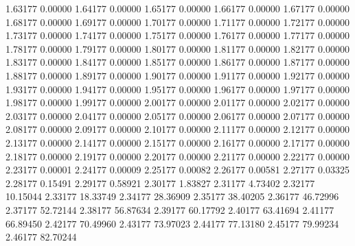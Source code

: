       1.63177      0.00000    
      1.64177      0.00000    
      1.65177      0.00000    
      1.66177      0.00000    
      1.67177      0.00000    
      1.68177      0.00000    
      1.69177      0.00000    
      1.70177      0.00000    
      1.71177      0.00000    
      1.72177      0.00000    
      1.73177      0.00000    
      1.74177      0.00000    
      1.75177      0.00000    
      1.76177      0.00000    
      1.77177      0.00000    
      1.78177      0.00000    
      1.79177      0.00000    
      1.80177      0.00000    
      1.81177      0.00000    
      1.82177      0.00000    
      1.83177      0.00000    
      1.84177      0.00000    
      1.85177      0.00000    
      1.86177      0.00000    
      1.87177      0.00000    
      1.88177      0.00000    
      1.89177      0.00000    
      1.90177      0.00000    
      1.91177      0.00000    
      1.92177      0.00000    
      1.93177      0.00000    
      1.94177      0.00000    
      1.95177      0.00000    
      1.96177      0.00000    
      1.97177      0.00000    
      1.98177      0.00000    
      1.99177      0.00000    
      2.00177      0.00000    
      2.01177      0.00000    
      2.02177      0.00000    
      2.03177      0.00000    
      2.04177      0.00000    
      2.05177      0.00000    
      2.06177      0.00000    
      2.07177      0.00000    
      2.08177      0.00000    
      2.09177      0.00000    
      2.10177      0.00000    
      2.11177      0.00000    
      2.12177      0.00000    
      2.13177      0.00000    
      2.14177      0.00000    
      2.15177      0.00000    
      2.16177      0.00000    
      2.17177      0.00000    
      2.18177      0.00000    
      2.19177      0.00000    
      2.20177      0.00000    
      2.21177      0.00000    
      2.22177      0.00000    
      2.23177      0.00001    
      2.24177      0.00009    
      2.25177      0.00082    
      2.26177      0.00581    
      2.27177      0.03325    
      2.28177      0.15491    
      2.29177      0.58921    
      2.30177      1.83827    
      2.31177      4.73402    
      2.32177     10.15044    
      2.33177     18.33749    
      2.34177     28.36909    
      2.35177     38.40205    
      2.36177     46.72996    
      2.37177     52.72144    
      2.38177     56.87634    
      2.39177     60.17792    
      2.40177     63.41694    
      2.41177     66.89450    
      2.42177     70.49960    
      2.43177     73.97023    
      2.44177     77.13180    
      2.45177     79.99234    
      2.46177     82.70244    
